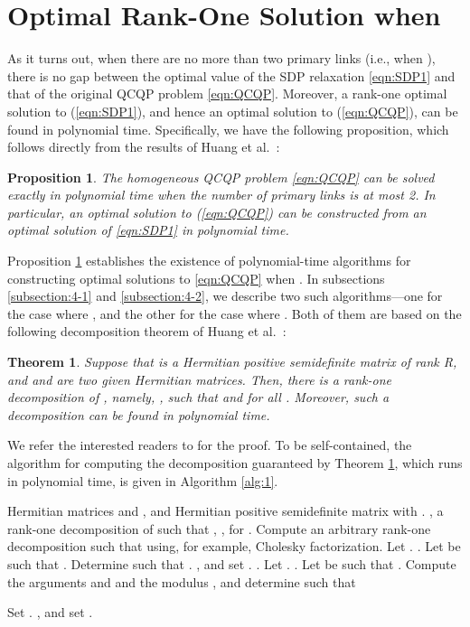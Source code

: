 \documentclass[twocolumn,10pt]{IEEEtran}
\theoremstyle{plain} \newtheorem{theorem}{Theorem}
\theoremstyle{plain} \newtheorem{proposition}{Proposition}
\theoremstyle{plain} \newtheorem{corollary}{Corollary}
\theoremstyle{remark} \newtheorem{remark}{Remark}
\theoremstyle{remark} \newtheorem{lemma}{Lemma}
\theoremstyle{plain} \newtheorem{definition}{Definition}
\theoremstyle{plain} \newtheorem{assumption}{Assumption}
\theoremstyle{plain} \newtheorem{fact}{Fact}
\begin{document}
\section{Optimal Rank-One Solution when }\label{sec:exact}
As it turns out, when there are no more than two primary links (i.e., when ), there is no gap between the optimal value of the SDP relaxation \eqref{eqn:SDP1} and that of the original QCQP problem \eqref{eqn:QCQP}.  Moreover, a rank-one optimal solution to (\ref{eqn:SDP1}), and hence an optimal solution to (\ref{eqn:QCQP}), can be found in polynomial time.  Specifically, we have the following proposition, which follows directly from the results of Huang et al.~\cite{HZ07,HdMZ10}:
\begin{proposition}\label{pro:nogap}
The homogeneous QCQP problem \eqref{eqn:QCQP} can be solved exactly in polynomial time when the number of primary links  is at most 2. In particular, an optimal solution to (\ref{eqn:QCQP}) can be constructed from an optimal solution of \eqref{eqn:SDP1} in polynomial time.
\end{proposition}
Proposition \ref{pro:nogap} establishes the existence of polynomial-time algorithms for constructing optimal solutions to \eqref{eqn:QCQP} when .  In subsections \ref{subsection:4-1} and \ref{subsection:4-2}, we describe two such algorithms---one for the case where , and the other for the case where .  Both of them are based on the following decomposition theorem of Huang et al.~\cite{HZ07,HdMZ10}:
\begin{theorem}\label{thm:decompose}
Suppose that  is a Hermitian positive semidefinite matrix of rank R, and  and  are two given Hermitian matrices. Then, there is a rank-one decomposition of , namely, , such that  and  for all .  Moreover, such a decomposition can be found in polynomial time.
\end{theorem}
We refer the interested readers to \cite{HdMZ10} for the proof. To be self-contained, the algorithm for computing the decomposition guaranteed by Theorem \ref{thm:decompose}, which runs in polynomial time, is given in Algorithm \ref{alg:1}.
\begin{algorithm}
\caption{Algorithm for computing the decomposition guaranteed by Theorem \ref{thm:decompose}}\label{alg:1}
\begin{algorithmic}[1]
\REQUIRE Hermitian matrices   and , and Hermitian positive semidefinite matrix  with .
\ENSURE , a rank-one decomposition of  such that , , for .
\STATE Compute an arbitrary rank-one decomposition  such that  using, for example, Cholesky factorization.
\STATE Let .
\REPEAT
{}
\STATE .
\ELSE
\STATE Let  be such that .
\STATE Determine  such that .
\STATE , and set 
\ENDIF
\IF {}
\STATE .
\ENDIF
\STATE .
\UNTIL  {}
\STATE Let .
\REPEAT
{}
\STATE .
\ELSE
\STATE Let  be such that .
\STATE Compute the arguments  and  and the modulus , and determine  such that

\STATE Set .
\STATE , and set 
\ENDIF
\IF {}
\STATE .
\ENDIF
\UNTIL 
\end{algorithmic}
\end{algorithm}
\end{document}
